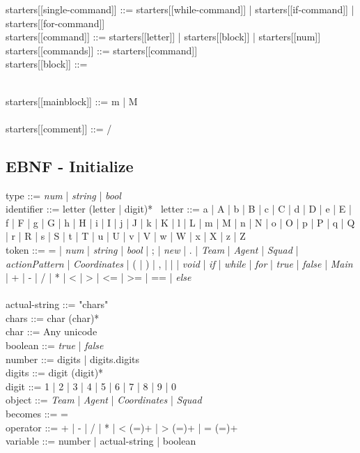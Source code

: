 starters[[single-command]] ::= starters[[while-command]] | starters[[if-command]] | starters[[for-command]] \\
starters[[command]] ::= starters[[letter]] | starters[[block]] | starters[[num]] \\
starters[[commands]] ::= starters[[command]] \\
starters[[block]] ::= { \\
starters[[mainblock]] ::= m | M \\
\\
starters[[comment]] ::= /


\subsection{EBNF - Initialize}
\label{ap:ebnf}

type ::= \textit{num} | \textit{string} | \textit{bool} \\
identifier ::= letter (letter | digit)* \
letter ::= a | A | b | B | c | C | d | D | e | E | f | F | g | G | h | H | i | I | j | J | k | K | l | L | m | M | n | N | o | O | p | P | q | Q | r | R | s | S | t | T | u | U | v | V | w | W | x | X | z | Z \\
token ::= = | \textit{num} | \textit{string} | \textit{bool} | ; | \textit{new} | . | \textit{Team} | \textit{Agent} | \textit{Squad} | \textit{actionPattern} | \textit{Coordinates}  | ( | ) | , | { | } | \textit{void} | \textit{if} | \textit{while} | \textit{for} | \textit{true} | \textit{false} | \textit{Main} | + | - | / | * | < | > | <= | >= | == | \textit{else} \\
\\
actual-string ::= "chars" \\
chars ::= char (char)* \\
char ::= Any unicode \\
boolean ::= \textit{true} | \textit{false} \\
number ::= digits | digits.digits \\
digits ::= digit (digit)* \\
digit ::= 1 | 2 | 3 | 4 | 5 | 6 | 7 | 8 | 9 | 0 \\
object ::= \textit{Team} | \textit{Agent} | \textit{Coordinates} | \textit{Squad} \\
becomes ::= = \\
operator ::= + | - | / | * | < (=)+ | > (=)+ | = (=)+ \\
variable ::= number | actual-string | boolean \\
}
